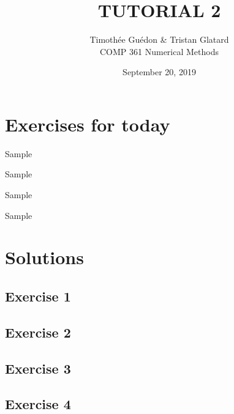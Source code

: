 \documentclass[12pt]{article}
\newenvironment{exercise}[2][Exercise]{\begin{trivlist}
\item[\hskip \labelsep {\bfseries #1}\hskip \labelsep {\bfseries #2.}]}{\end{trivlist}}
\begin{document}
\title{TUTORIAL 2}
\author{Timothée Guédon \& Tristan Glatard\\
COMP 361 Numerical Methods}
\date{September 20, 2019}
\maketitle

\section{Exercises for today}

\begin{exercise}{1}
Sample
\end{exercise}

\begin{exercise}{2}
Sample
\end{exercise}

\begin{exercise}{3}
Sample
\end{exercise}

\begin{exercise}{4}
Sample
\end{exercise}

\break

\section{Solutions}

\subsection{Exercise 1}


\subsection{Exercise 2}


\subsection{Exercise 3}


\subsection{Exercise 4}
\end{document}
